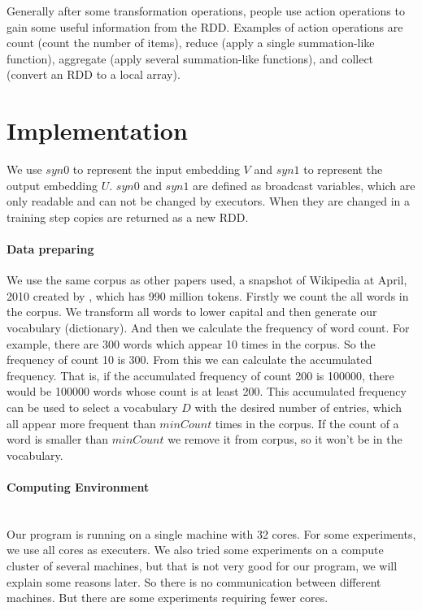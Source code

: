 Generally after some transformation operations, people use action operations to gain some useful information from the RDD. Examples of action operations are count (count the number of items), reduce (apply a single summation-like function), aggregate (apply several summation-like functions), and collect (convert an RDD to a local array). 
 


\section{Implementation}

We use $syn0$ to represent the input embedding $V$ and $syn1$ to represent the output embedding $U$. $syn0$ and $syn1$ are defined as broadcast variables, which are only readable and can not be changed by executors. When they are changed in a training step copies are returned as a new RDD.


\paragraph{Data preparing} 
We use the same corpus as other papers used, a snapshot of Wikipedia at April, 2010 created by \cite{Shaoul2010}, which has 990 million tokens. Firstly we count the all words in the corpus. We transform all words to lower capital and then generate our vocabulary (dictionary). And then we calculate the frequency of word count. For example, there are 300 words which appear 10 times in the corpus. So the frequency of count 10 is 300. From this we can calculate the accumulated frequency. That is, if the accumulated frequency of count 200 is 100000, there would be 100000 words whose count is at least 200. This accumulated frequency can be used to select a vocabulary $D$ with the desired number of entries, which all appear more frequent than $minCount$ times in the corpus.  If the count of a word is smaller than $minCount$ we remove it from corpus, so it won't be in the vocabulary.  

\paragraph{Computing Environment} \ \\
Our program is running on a single machine with 32 cores. For some experiments, we use all cores as executers. We also tried some experiments on a compute cluster of several machines, but that is not very good for our program, we will explain some reasons later. So there is no communication between different machines.  But there are some experiments requiring fewer cores.


